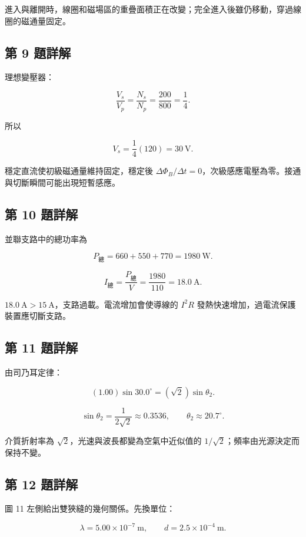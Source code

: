 \documentclass[11pt,a4paper]{article}
\begin{document}
進入與離開時，線圈和磁場區的重疊面積正在改變；完全進入後雖仍移動，穿過線圈的磁通量固定。

\subsection{第 9 題詳解}\label{ux7b2c-9-ux984cux8a73ux89e3}

理想變壓器：

\[
\frac{V_s}{V_p}=\frac{N_s}{N_p}
=\frac{200}{800}=\frac14.
\]

所以

\[
V_s=\frac14(120)=30\ \mathrm V.
\]

穩定直流使初級磁通量維持固定，穩定後 \(\Delta\Phi_B/\Delta t=0\)，次級感應電壓為零。接通與切斷瞬間可能出現短暫感應。

\subsection{第 10 題詳解}\label{ux7b2c-10-ux984cux8a73ux89e3}

並聯支路中的總功率為

\[
P_{\text{總}}=660+550+770=1980\ \mathrm W.
\]

\[
I_{\text{總}}=\frac{P_{\text{總}}}{V}
=\frac{1980}{110}=18.0\ \mathrm A.
\]

\(18.0\ \mathrm A>15\ \mathrm A\)，支路過載。電流增加會使導線的 \(I^2R\) 發熱快速增加，過電流保護裝置應切斷支路。

\subsection{第 11 題詳解}\label{ux7b2c-11-ux984cux8a73ux89e3}

由司乃耳定律：

\[
(1.00)\sin30.0^\circ
=(\sqrt2)\sin\theta_2.
\]

\[
\sin\theta_2=\frac{1}{2\sqrt2}\approx0.3536,
\qquad
\theta_2\approx20.7^\circ.
\]

介質折射率為 \(\sqrt2\)，光速與波長都變為空氣中近似值的 \(1/\sqrt2\)；頻率由光源決定而保持不變。

\subsection{第 12 題詳解}\label{ux7b2c-12-ux984cux8a73ux89e3}

圖 11 左側給出雙狹縫的幾何關係。先換單位：

\[
\lambda=5.00\times10^{-7}\ \mathrm m,
\qquad
d=2.5\times10^{-4}\ \mathrm m.
\]
\end{document}
